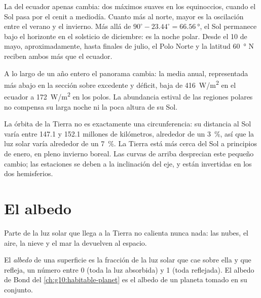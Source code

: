 \begin{remark}\label{rem:g10:earth-energy-budget:curves}
La  del ecuador apenas cambia: dos máximos suaves en los
equinoccios, cuando el Sol pasa por el cenit a mediodía. Cuanto más al norte,
mayor es la oscilación entre el verano y el invierno. Más allá de
$90^\circ - 23.44^\circ = \qty{66.56}{\degree}$, el Sol permanece bajo el
horizonte en el solsticio de diciembre: es la noche polar. Desde el 10 de
mayo, aproximadamente, hasta finales de julio, el Polo Norte y la latitud
\qty{60}{\degree} N reciben ambos más que el ecuador.
\end{remark}

A lo largo de un año entero el panorama cambia: la  media anual,
representada más abajo en la sección sobre excedente y déficit, baja de
\qty{416}{W/m^2} en el ecuador a \qty{172}{W/m^2} en los polos. La
abundancia estival de las regiones polares no compensa su larga noche ni la
poca altura de su Sol.

\begin{remark}\label{rem:g10:earth-energy-budget:distance}
La órbita de la Tierra no es exactamente una circunferencia: su distancia al
Sol varía entre \num{147.1} y \num{152.1} millones de kilómetros, alrededor
de un \qty{3}{\percent}, así que la luz solar varía alrededor de un
\qty{7}{\percent}. La Tierra está más cerca del Sol a principios de enero,
en pleno invierno boreal. Las curvas de arriba desprecian este pequeño
cambio; las estaciones se deben a la inclinación del eje, y están invertidas
en los dos hemisferios.
\end{remark}

\section{El albedo}

Parte de la luz solar que llega a la Tierra no calienta nunca nada: las
nubes, el aire, la nieve y el mar la devuelven al espacio.

\begin{definition}[Albedo]\label{def:g10:earth-energy-budget:albedo}
El \emph{albedo} de una superficie es la fracción de la luz
solar que cae sobre ella y que refleja, un número entre 0 (toda la luz
absorbida) y 1 (toda reflejada). El albedo de Bond del
\cref{ch:g10:habitable-planet} es el albedo de un planeta tomado en su
conjunto.
\end{definition}

